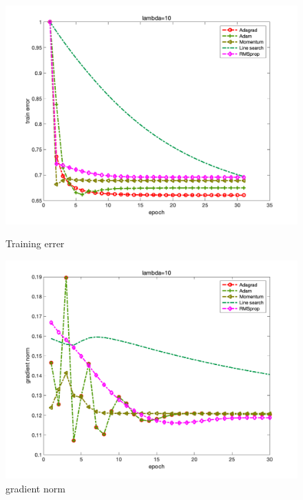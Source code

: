 \documentclass{article}
\begin{document}
\begin{figure}[H]
	\begin{minipage}{0.33\linewidth}
		\centering
		\includegraphics[width=1\linewidth]{./fig/fval_g1}
		\caption{Training errer}
	\end{minipage}
	\begin{minipage}{0.33\linewidth}
		\centering
		\includegraphics[width=1\linewidth]{./fig/gnorm_g1}
		\caption{gradient norm}
	\end{minipage}
	\begin{minipage}{0.33\linewidth}
		\centering

\end{minipage}
\end{figure}
\end{document}
